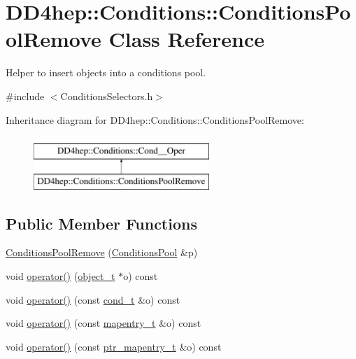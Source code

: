 \hypertarget{class_d_d4hep_1_1_conditions_1_1_conditions_pool_remove}{}\section{D\+D4hep\+:\+:Conditions\+:\+:Conditions\+Pool\+Remove Class Reference}
\label{class_d_d4hep_1_1_conditions_1_1_conditions_pool_remove}


Helper to insert objects into a conditions pool.  




{\ttfamily \#include $<$Conditions\+Selectors.\+h$>$}

Inheritance diagram for D\+D4hep\+:\+:Conditions\+:\+:Conditions\+Pool\+Remove\+:\begin{figure}[H]
\begin{center}
\leavevmode
\includegraphics[height=2.000000cm]{class_d_d4hep_1_1_conditions_1_1_conditions_pool_remove}
\end{center}
\end{figure}
\subsection*{Public Member Functions}
\begin{DoxyCompactItemize}
\item 
\hyperlink{class_d_d4hep_1_1_conditions_1_1_conditions_pool_remove_abc0edc988a0117b97e68d824cb07da9c}{Conditions\+Pool\+Remove} (\hyperlink{class_d_d4hep_1_1_conditions_1_1_conditions_pool}{Conditions\+Pool} \&p)
\item 
void \hyperlink{class_d_d4hep_1_1_conditions_1_1_conditions_pool_remove_ae331d31a1823e19896efd06f81cd84b5}{operator()} (\hyperlink{class_d_d4hep_1_1_conditions_1_1_cond_____oper_a4229491e49bfd21058dff10125a73f63}{object\+\_\+t} $\ast$o) const
\item 
void \hyperlink{class_d_d4hep_1_1_conditions_1_1_conditions_pool_remove_aeeb1b39a52afd76a37913c7868e2a90d}{operator()} (const \hyperlink{class_d_d4hep_1_1_conditions_1_1_cond_____oper_aceca9f6a0e8c84364946eace47275d09}{cond\+\_\+t} \&o) const
\item 
void \hyperlink{class_d_d4hep_1_1_conditions_1_1_conditions_pool_remove_a7e5a8677d8ceeaed7a5bb0b1b1e2ff68}{operator()} (const \hyperlink{class_d_d4hep_1_1_conditions_1_1_cond_____oper_a877dac3da66795207aed15be219acbdc}{mapentry\+\_\+t} \&o) const
\item 
void \hyperlink{class_d_d4hep_1_1_conditions_1_1_conditions_pool_remove_adaffcc5aeb240c7539e89a080fb3ee9f}{operator()} (const \hyperlink{class_d_d4hep_1_1_conditions_1_1_cond_____oper_a0949e4bd5f90cd3fae2394cf30983973}{ptr\+\_\+mapentry\+\_\+t} \&o) const
\end{DoxyCompactItemize}
